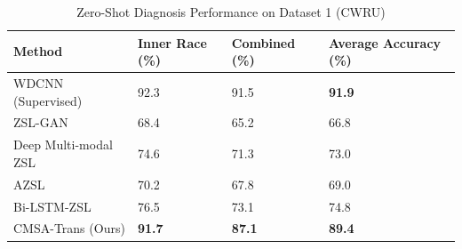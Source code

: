 \begin{table}[htbp]
\centering
\caption{Zero-Shot Diagnosis Performance on Dataset 1 (CWRU)}
\label{tab:cwru_results}
\begin{tabular}{p{3.5cm}p{2.5cm}p{2.5cm}p{3cm}}
\toprule
\textbf{Method} & \textbf{Inner Race (\%)} & \textbf{Combined (\%)} & \textbf{Average Accuracy (\%)} \\
\midrule
WDCNN (Supervised) & 92.3 & 91.5 & \textbf{91.9} \\
\midrule
ZSL-GAN & 68.4 & 65.2 & 66.8 \\
\midrule
Deep Multi-modal ZSL & 74.6 & 71.3 & 73.0 \\
\midrule
AZSL & 70.2 & 67.8 & 69.0 \\
\midrule
Bi-LSTM-ZSL & 76.5 & 73.1 & 74.8 \\
\midrule
CMSA-Trans (Ours) & \textbf{91.7} & \textbf{87.1} & \textbf{89.4} \\
\bottomrule
\end{tabular}
\end{table}

